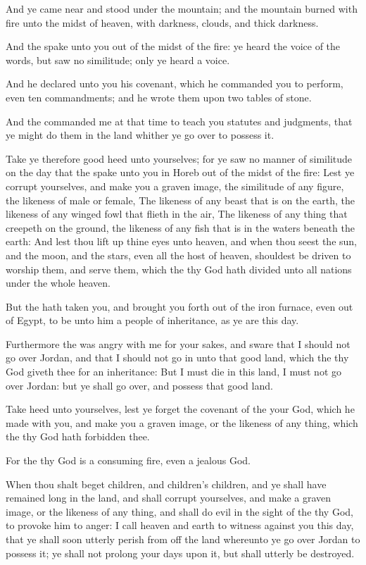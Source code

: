 \Verse And ye came near and stood under the mountain; and the mountain burned with fire unto the midst of heaven, with darkness, clouds, and thick darkness.

\Verse And the \LORD spake unto you out of the midst of the fire: ye heard the voice of the words, but saw no similitude; only ye heard a voice.

\Verse And he declared unto you his covenant, which he commanded you to perform, even ten commandments; and he wrote them upon two tables of stone.

\Verse And the \LORD commanded me at that time to teach you statutes and judgments, that ye might do them in the land whither ye go over to possess it.

\Verse Take ye therefore good heed unto yourselves; for ye saw no manner of similitude on the day that the \LORD spake unto you in Horeb out of the midst of the fire: \Verse Lest ye corrupt yourselves, and make you a graven image, the similitude of any figure, the likeness of male or female, \Verse The likeness of any beast that is on the earth, the likeness of any winged fowl that flieth in the air, \Verse The likeness of any thing that creepeth on the ground, the likeness of any fish that is in the waters beneath the earth: \Verse And lest thou lift up thine eyes unto heaven, and when thou seest the sun, and the moon, and the stars, even all the host of heaven, shouldest be driven to worship them, and serve them, which the \LORD thy God hath divided unto all nations under the whole heaven.

\Verse But the \LORD hath taken you, and brought you forth out of the iron furnace, even out of Egypt, to be unto him a people of inheritance, as ye are this day.

\Verse Furthermore the \LORD was angry with me for your sakes, and sware that I should not go over Jordan, and that I should not go in unto that good land, which the \LORD thy God giveth thee for an inheritance: \Verse But I must die in this land, I must not go over Jordan: but ye shall go over, and possess that good land.

\Verse Take heed unto yourselves, lest ye forget the covenant of the \LORD your God, which he made with you, and make you a graven image, or the likeness of any thing, which the \LORD thy God hath forbidden thee.

\Verse For the \LORD thy God is a consuming fire, even a jealous God.

\Verse When thou shalt beget children, and children's children, and ye shall have remained long in the land, and shall corrupt yourselves, and make a graven image, or the likeness of any thing, and shall do evil in the sight of the \LORD thy God, to provoke him to anger: \Verse I call heaven and earth to witness against you this day, that ye shall soon utterly perish from off the land whereunto ye go over Jordan to possess it; ye shall not prolong your days upon it, but shall utterly be destroyed.

